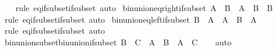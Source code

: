 \begin{isabellebody}
%
\isadelimproof
\ \ %
\endisadelimproof
%
\isatagproof
{}\isamarkupfalse%
\ {\isacharparenleft}{\kern0pt}rule\ eq{\isacharunderscore}{\kern0pt}if{\isacharunderscore}{\kern0pt}subset{\isacharunderscore}{\kern0pt}if{\isacharunderscore}{\kern0pt}subset{\isacharparenright}{\kern0pt}\ auto%
\endisatagproof
{\isafoldproof}%
%
\isadelimproof
\isanewline
%
\endisadelimproof
\isanewline
{}\isamarkupfalse%
\ bin{\isacharunderscore}{\kern0pt}union{\isacharunderscore}{\kern0pt}eq{\isacharunderscore}{\kern0pt}right{\isacharunderscore}{\kern0pt}if{\isacharunderscore}{\kern0pt}subset{\isacharcolon}{\kern0pt}\ {\isachardoublequoteopen}A\ {\isasymsubseteq}\ B\ {\isasymLongrightarrow}\ A\ {\isasymunion}\ B\ {\isacharequal}{\kern0pt}\ B{\isachardoublequoteclose}\isanewline
%
\isadelimproof
\ \ %
\endisadelimproof
%
\isatagproof
{}\isamarkupfalse%
\ {\isacharparenleft}{\kern0pt}rule\ eq{\isacharunderscore}{\kern0pt}if{\isacharunderscore}{\kern0pt}subset{\isacharunderscore}{\kern0pt}if{\isacharunderscore}{\kern0pt}subset{\isacharparenright}{\kern0pt}\ auto%
\endisatagproof
{\isafoldproof}%
%
\isadelimproof
\isanewline
%
\endisadelimproof
\isanewline
{}\isamarkupfalse%
\ bin{\isacharunderscore}{\kern0pt}union{\isacharunderscore}{\kern0pt}eq{\isacharunderscore}{\kern0pt}left{\isacharunderscore}{\kern0pt}if{\isacharunderscore}{\kern0pt}subset{\isacharcolon}{\kern0pt}\ {\isachardoublequoteopen}B\ {\isasymsubseteq}\ A\ {\isasymLongrightarrow}\ A\ {\isasymunion}\ B\ {\isacharequal}{\kern0pt}\ A{\isachardoublequoteclose}\isanewline
%
\isadelimproof
\ \ %
\endisadelimproof
%
\isatagproof
{}\isamarkupfalse%
\ {\isacharparenleft}{\kern0pt}rule\ eq{\isacharunderscore}{\kern0pt}if{\isacharunderscore}{\kern0pt}subset{\isacharunderscore}{\kern0pt}if{\isacharunderscore}{\kern0pt}subset{\isacharparenright}{\kern0pt}\ auto%
\endisatagproof
{\isafoldproof}%
%
\isadelimproof
\isanewline
%
\endisadelimproof
\isanewline
{}\isamarkupfalse%
\ bin{\isacharunderscore}{\kern0pt}union{\isacharunderscore}{\kern0pt}subset{\isacharunderscore}{\kern0pt}bin{\isacharunderscore}{\kern0pt}union{\isacharunderscore}{\kern0pt}if{\isacharunderscore}{\kern0pt}subset{\isacharcolon}{\kern0pt}\ {\isachardoublequoteopen}B\ {\isasymsubseteq}\ C\ {\isasymLongrightarrow}\ A\ {\isasymunion}\ B\ {\isasymsubseteq}\ A\ {\isasymunion}\ C{\isachardoublequoteclose}\isanewline
%
\isadelimproof
\ \ %
\endisadelimproof
%
\isatagproof
{}\isamarkupfalse%
\ auto%
\endisatagproof
{\isafoldproof}%
%
\isadelimproof
\isanewline
%
\endisadelimproof

\end{isabellebody}
